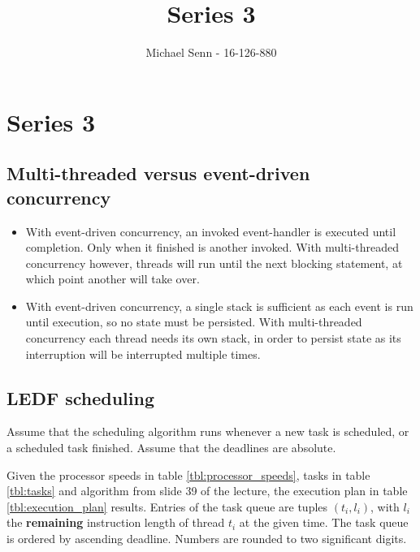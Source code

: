 \documentclass[a4paper]{scrreprt}
\title{Series 3}
\author{Michael Senn \maillink{michael.senn@students.unibe.ch} - 16-126-880}
\date{\printdate}
\begin{document}
\maketitle


\setcounter{chapter}{2}

\chapter{Series 3}

\section{Multi-threaded versus event-driven concurrency}

\begin{itemize}
		\item With event-driven concurrency, an invoked event-handler is
				executed until completion. Only when it finished is another
				invoked. With multi-threaded concurrency however, threads will
				run until the next blocking statement, at which point another
				will take over.
		\item With event-driven concurrency, a single stack is sufficient as
				each event is run until execution, so no state must be
				persisted. With multi-threaded concurrency each thread needs
				its own stack, in order to persist state as its interruption
				will be interrupted multiple times.
\end{itemize}

\section{LEDF scheduling}

Assume that the scheduling algorithm runs whenever a new task is scheduled, or
a scheduled task finished. Assume that the deadlines are absolute.

Given the processor speeds in table \ref{tbl:processor_speeds}, tasks in table
\ref{tbl:tasks} and algorithm from slide 39 of the lecture, the execution plan
in table \ref{tbl:execution_plan} results. Entries of the task queue are tuples
$(t_i, l_i)$, with $l_i$ the \textbf{remaining} instruction length of thread
$t_i$ at the given time. The task queue is ordered by ascending deadline.
Numbers are rounded to two significant digits.
\end{document}
